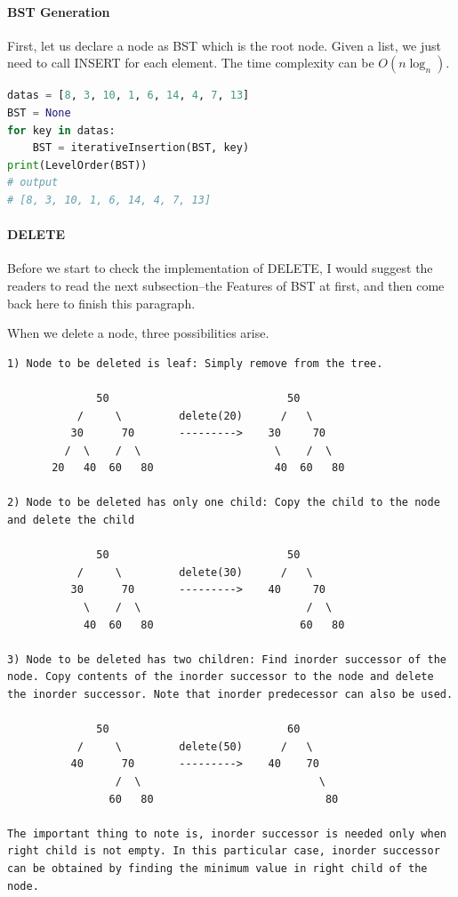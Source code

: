 \documentclass[../main.tex]{subfiles}
\begin{document}
\paragraph{BST Generation}
First, let us declare a node as BST which is the root node. Given a list, we just need to call INSERT for each element. The time complexity can be $O(n\log_n)$.
\begin{lstlisting}[language=Python]
datas = [8, 3, 10, 1, 6, 14, 4, 7, 13]
BST = None
for key in datas:
    BST = iterativeInsertion(BST, key)
print(LevelOrder(BST))
# output 
# [8, 3, 10, 1, 6, 14, 4, 7, 13]
\end{lstlisting}
\paragraph{DELETE} 
Before we start to check the implementation of DELETE, I would suggest the readers to read the next subsection--the Features of BST at first, and then come back here to finish this paragraph. 

When we delete a node, three possibilities arise.
\begin{lstlisting}[numbers=none]
1) Node to be deleted is leaf: Simply remove from the tree.

              50                            50
           /     \         delete(20)      /   \
          30      70       --------->    30     70 
         /  \    /  \                     \    /  \ 
       20   40  60   80                   40  60   80

2) Node to be deleted has only one child: Copy the child to the node and delete the child

              50                            50
           /     \         delete(30)      /   \
          30      70       --------->    40     70 
            \    /  \                          /  \ 
            40  60   80                       60   80

3) Node to be deleted has two children: Find inorder successor of the node. Copy contents of the inorder successor to the node and delete the inorder successor. Note that inorder predecessor can also be used.

              50                            60
           /     \         delete(50)      /   \
          40      70       --------->    40    70 
                 /  \                            \ 
                60   80                           80

The important thing to note is, inorder successor is needed only when right child is not empty. In this particular case, inorder successor can be obtained by finding the minimum value in right child of the node.
\end{lstlisting}
\end{document}
